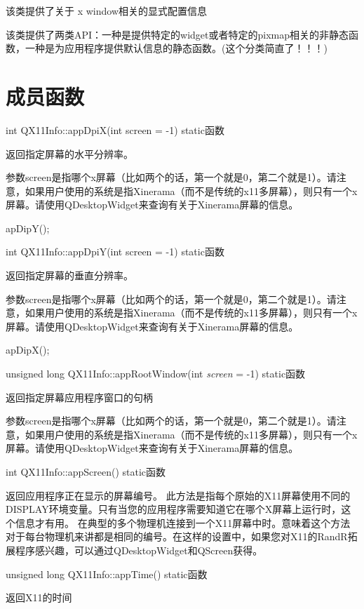 该类提供了关于 x window相关的显式配置信息

该类提供了两类API：一种是提供特定的widget或者特定的pixmap相关的非静态函数，一种是为应用程序提供默认信息的静态函数。(这个分类简直了！！！)

\section{成员函数}

int QX11Info::appDpiX(int screen = -1) static函数

返回指定屏幕的水平分辨率。

参数screen是指哪个x屏幕（比如两个的话，第一个就是0，第二个就是1）。请注意，如果用户使用的系统是指Xinerama（而不是传统的x11多屏幕），则只有一个x屏幕。请使用QDesktopWidget来查询有关于Xinerama屏幕的信息。

\begin{notice}[另请参阅]
apDipY();
\end{notice}

int QX11Info::appDpiY(int screen = -1) static函数

返回指定屏幕的垂直分辨率。

参数screen是指哪个x屏幕（比如两个的话，第一个就是0，第二个就是1）。请注意，如果用户使用的系统是指Xinerama（而不是传统的x11多屏幕），则只有一个x屏幕。请使用QDesktopWidget来查询有关于Xinerama屏幕的信息。

\begin{notice}[另请参阅]
apDipX();
\end{notice}

unsigned long QX11Info::appRootWindow(int \emph{screen} = -1) static函数

返回指定屏幕应用程序窗口的句柄

参数screen是指哪个x屏幕（比如两个的话，第一个就是0，第二个就是1）。请注意，如果用户使用的系统是指Xinerama（而不是传统的x11多屏幕），则只有一个x屏幕。请使用QDesktopWidget来查询有关于Xinerama屏幕的信息。

int QX11Info::appScreen() static函数

返回应用程序正在显示的屏幕编号。 此方法是指每个原始的X11屏幕使用不同的DISPLAY环境变量。只有当您的应用程序需要知道它在哪个X屏幕上运行时，这个信息才有用。 在典型的多个物理机连接到一个X11屏幕中时。意味着这个方法对于每台物理机来讲都是相同的编号。在这样的设置中，如果您对X11的RandR拓展程序感兴趣，可以通过QDesktopWidget和QScreen获得。

unsigned long QX11Info::appTime() static函数

返回X11的时间

